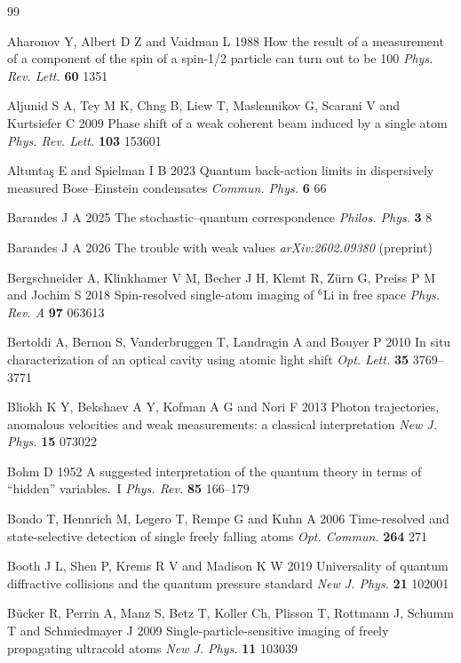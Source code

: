 \documentclass[11pt,a4paper]{article}
\begin{document}
\begin{thebibliography}{99}

Aharonov Y, Albert D Z and Vaidman L 1988 How the result of a measurement of a component of the spin of a spin-1/2 particle can turn out to be 100 \textit{Phys. Rev. Lett.} \textbf{60} 1351

Aljunid S A, Tey M K, Chng B, Liew T, Maslennikov G, Scarani V and Kurtsiefer C 2009 Phase shift of a weak coherent beam induced by a single atom \textit{Phys. Rev. Lett.} \textbf{103} 153601

Altunta\c{s} E and Spielman I B 2023 Quantum back-action limits in dispersively measured Bose--Einstein condensates \textit{Commun. Phys.} \textbf{6} 66

Barandes J A 2025 The stochastic--quantum correspondence \textit{Philos. Phys.} \textbf{3} 8

Barandes J A 2026 The trouble with weak values \textit{arXiv:2602.09380} (preprint)

Bergschneider A, Klinkhamer V M, Becher J H, Klemt R, Z\"urn G, Preiss P M and Jochim S 2018 Spin-resolved single-atom imaging of $^6$Li in free space \textit{Phys. Rev. A} \textbf{97} 063613

Bertoldi A, Bernon S, Vanderbruggen T, Landragin A and Bouyer P 2010 In situ characterization of an optical cavity using atomic light shift \textit{Opt. Lett.} \textbf{35} 3769--3771

Bliokh K Y, Bekshaev A Y, Kofman A G and Nori F 2013 Photon trajectories, anomalous velocities and weak measurements: a classical interpretation \textit{New J. Phys.} \textbf{15} 073022

Bohm D 1952 A suggested interpretation of the quantum theory in terms of ``hidden'' variables.~I \textit{Phys. Rev.} \textbf{85} 166--179

Bondo T, Hennrich M, Legero T, Rempe G and Kuhn A 2006 Time-resolved and state-selective detection of single freely falling atoms \textit{Opt. Commun.} \textbf{264} 271

Booth J L, Shen P, Krems R V and Madison K W 2019 Universality of quantum diffractive collisions and the quantum pressure standard \textit{New J. Phys.} \textbf{21} 102001

B\"ucker R, Perrin A, Manz S, Betz T, Koller Ch, Plisson T, Rottmann J, Schumm T and Schmiedmayer J 2009 Single-particle-sensitive imaging of freely propagating ultracold atoms \textit{New J. Phys.} \textbf{11} 103039


\end{thebibliography}
\end{document}
